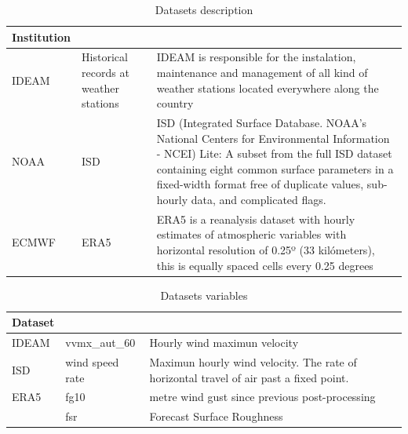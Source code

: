 \documentclass[12pt,oneside]{reedthesis}
\begin{document}
\begingroup\fontsize{10}{12}\selectfont
\begin{longtable}[t]{l>{\raggedright\arraybackslash}p{0.8in}>{\raggedright\arraybackslash}p{4in}}
\caption[Datasets]{\label{tab:tabledatasources1}Datasets description}\\
\toprule
\multicolumn{1}{l}{Institution} & \multicolumn{1}{l}{Dataset} & \multicolumn{1}{l}{Details}\\
\midrule
IDEAM & Historical records at weather stations & IDEAM is responsible for the instalation, maintenance and management of all kind of weather stations located everywhere along the country\\
NOAA & ISD & ISD (Integrated Surface Database. NOAA's National Centers for Environmental Information - NCEI) Lite: A subset from the full ISD dataset containing eight common surface parameters in a fixed-width format free of duplicate values, sub-hourly data, and complicated flags.\\
ECMWF & ERA5 & ERA5 is a reanalysis dataset with hourly estimates of atmospheric variables with horizontal resolution of 0.25º (33 kilómeters), this is equally spaced cells every 0.25 degrees\\
\bottomrule
\end{longtable}
\endgroup{}

\begingroup\fontsize{10}{12}\selectfont
\begin{longtable}[t]{l>{\raggedright\arraybackslash}p{1.2in}>{\raggedright\arraybackslash}p{3.5in}}
\caption[Variables]{\label{tab:tabledatasources2}Datasets variables}\\
\toprule
\multicolumn{1}{l}{Dataset} & \multicolumn{1}{l}{Variables} & \multicolumn{1}{l}{Description}\\
\midrule
IDEAM & vvmx\_aut\_60 & Hourly wind maximun velocity\\
ISD & wind speed rate & Maximun hourly wind velocity. The rate of horizontal travel of air past a fixed point.\\
ERA5 & fg10 & 10 metre wind gust since previous post-processing\\
 & fsr & Forecast Surface Roughness\\
\bottomrule
\end{longtable}
\endgroup{}
\end{document}
